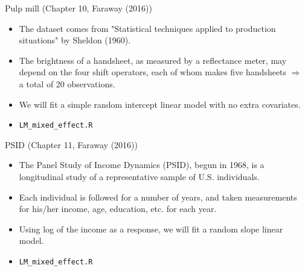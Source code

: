 \documentclass{beamer}
\newenvironment{wideitemize}%
  {\begin{itemize}%
    \setlength{\parskip}{1em}}%
  {\end{itemize}}
\begin{document}

\begin{frame} { Pulp mill (Chapter 10, Faraway (2016))}
\begin{wideitemize}

\item The dataset comes from  "Statistical techniques applied to production situations" by Sheldon (1960).


\item The brightness of a handsheet, as measured by a reflectance meter,  may depend on the four shift operators, each of whom makes five handsheets $\Rightarrow$ a total of 20 observations.



\item We will fit a simple random intercept linear model with no extra covariates. 

\item \texttt{LM\_mixed\_effect.R}
\end{wideitemize}


\end{frame}

\begin{frame} { PSID  (Chapter 11, Faraway (2016))}
\begin{wideitemize}


\item The Panel Study of Income Dynamics (PSID), begun in 1968, is a longitudinal study of a representative sample of U.S. individuals. 

\item Each individual is followed for a number of years, and taken measurements for his/her income, age, education, etc. for each year.

\item Using log of the income as a response, we will fit a  random slope linear model.
\item \texttt{LM\_mixed\_effect.R}
\end{wideitemize}


\end{frame}
\end{document}
